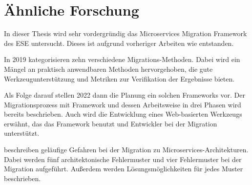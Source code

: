 \chapter{Ähnliche Forschung}
\label{chap:aehnliche-forschung}

In dieser Thesis wird sehr vordergründig das Microservices Migration Framework des ESE  untersucht.
Dieses ist aufgrund vorheriger Arbeiten wie  entstanden.

In 2019 kategorisieren  zehn verschiedene Migrations-Methoden.
Dabei wird ein Mängel an praktisch anwendbaren Methoden hervorgehoben, die gute Werkzeugunterstützung und Metriken zur Verifikation der Ergebnisse bieten.

Als Folge darauf stellen  2022 dann die Planung ein solchen Frameworks vor. Der Migrationsprozess mit Framework und dessen Arbeitsweise in drei Phasen wird bereits beschrieben. Auch wird die Entwicklung eines Web-basierten Werkzeugs erwähnt, das das Framework benutzt und Entwickler bei der Migration unterstützt.

 beschreiben geläufige Gefahren bei der Migration zu Microservices-Architekturen.
Dabei  werden fünf architektonische Fehlermuster und vier Fehlermuster bei der Migration aufgeführt.
Außerdem werden Lösungsmöglichkeiten für jedes Muster beschrieben.

%
%
